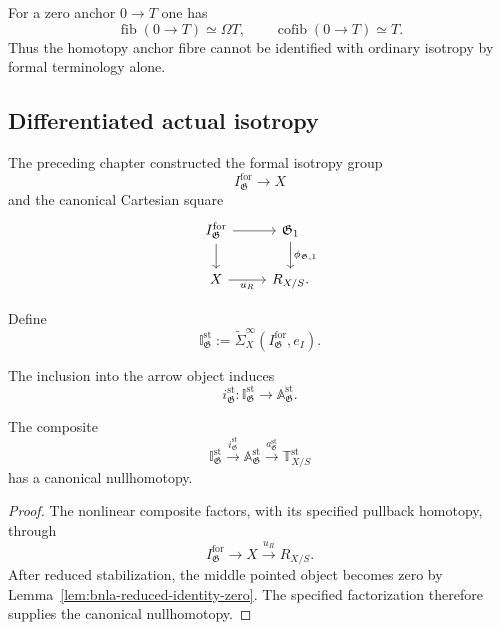 \begin{remark}
For a zero anchor $0\to T$ one has
\[
    \operatorname{fib}(0\to T)\simeq\Omega T,
    \qquad
    \operatorname{cofib}(0\to T)\simeq T.
\]
Thus the homotopy anchor fibre cannot be identified with ordinary isotropy by
formal terminology alone.
\end{remark}

\subsection{Differentiated actual isotropy}

The preceding chapter constructed the formal isotropy group
\[
    I^{\mathrm{for}}_{\mathfrak G}\longrightarrow X
\]
and the canonical Cartesian square
\[
\begin{tikzcd}
I^{\mathrm{for}}_{\mathfrak G}
  \arrow[r]
  \arrow[d] &
\mathfrak G_1
  \arrow[d,"\phi_{\mathfrak G,1}"]\\
X \arrow[r,"u_R"'] & R_{X/S}.
\end{tikzcd}
\]

\begin{definition}
\label{def:bnla-stable-formal-isotropy}
Define
\[
    \mathbb I^{\mathrm{st}}_{\mathfrak G}
    :=
    \widetilde\Sigma^\infty_X
    \left(I^{\mathrm{for}}_{\mathfrak G},e_I\right).
\]
\end{definition}

The inclusion into the arrow object induces
\[
    i^{\mathrm{st}}_{\mathfrak G}:
    \mathbb I^{\mathrm{st}}_{\mathfrak G}
    \longrightarrow
    \mathbb A^{\mathrm{st}}_{\mathfrak G}.
\]

\begin{proposition}
\label{prop:bnla-stable-isotropy-null}
The composite
\[
    \mathbb I^{\mathrm{st}}_{\mathfrak G}
    \xrightarrow{i^{\mathrm{st}}_{\mathfrak G}}
    \mathbb A^{\mathrm{st}}_{\mathfrak G}
    \xrightarrow{a^{\mathrm{st}}_{\mathfrak G}}
    \mathbb T^{\mathrm{st}}_{X/S}
\]
has a canonical nullhomotopy.
\end{proposition}

\begin{proof}
The nonlinear composite factors, with its specified pullback homotopy, through
\[
    I^{\mathrm{for}}_{\mathfrak G}\longrightarrow
    X\xrightarrow{u_R}R_{X/S}.
\]
After reduced stabilization, the middle pointed object becomes zero by
Lemma~\ref{lem:bnla-reduced-identity-zero}.  The specified factorization
therefore supplies the canonical nullhomotopy.
\end{proof}

